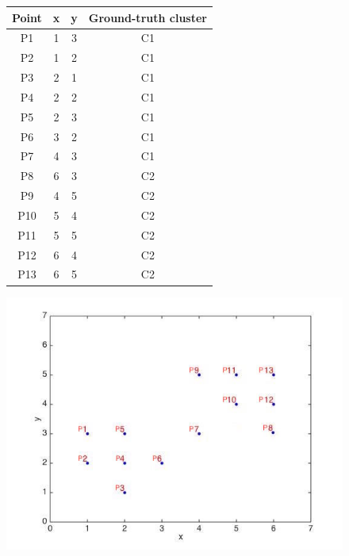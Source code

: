 \begin{figure}[htbp]
    \begin{minipage}[b]{.5\textwidth }
     \centering

    \begin{tabular}{|c|c|c|c|}
    \hline
    Point    & x    & y & 
    Ground-truth cluster \bigstrut\\
    \hline
    P1     & 1   & 3 & C1 \bigstrut\\
    \hline
    P2     & 1   & 2 & C1 \bigstrut\\
    \hline
    P3   & 2   & 1 & C1\bigstrut\\
    \hline
    P4     & 2   & 2 & C1\bigstrut\\
    \hline
    P5   & 2     & 3 & C1\bigstrut\\
    \hline
    P6   & 3     & 2 & C1\bigstrut\\
    \hline
    P7   & 4   & 3 & C1\bigstrut\\
    \hline
    P8   & 6     & 3 & C2\bigstrut\\
    \hline
    P9   & 4     & 5 & C2\bigstrut\\
    \hline
    P10   & 5     & 4 & C2\bigstrut\\
    \hline
    P11   & 5     & 5 & C2\bigstrut\\
    \hline
    P12   & 6     & 4 & C2\bigstrut\\
    \hline
    P13   & 6     & 5 & C2\bigstrut\\
    \hline
    \end{tabular}%
        \vspace{0pt}
    \end{minipage}%
    \begin{minipage}[b]{.5\textwidth}
   \centering
        \includegraphics[width=\textwidth]{fig/clustering_data.jpg}

\end{minipage}
\end{figure}
